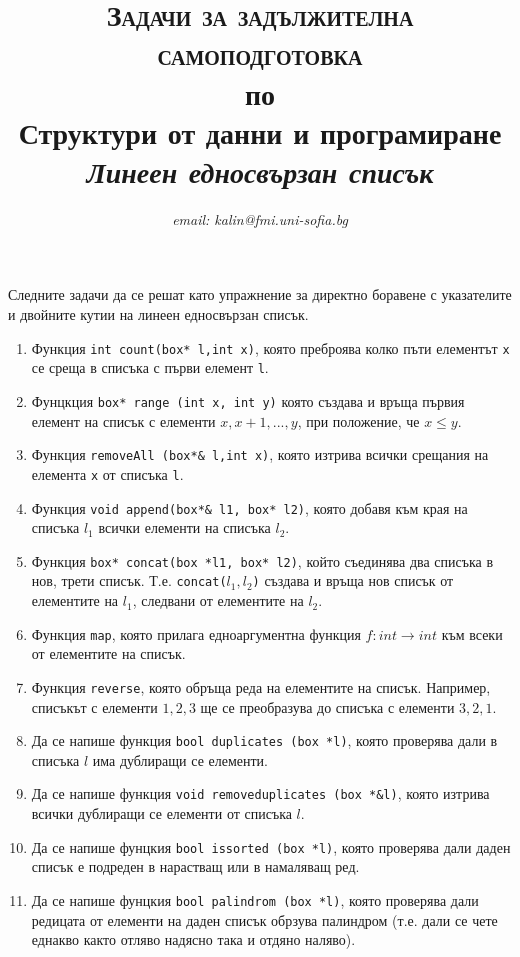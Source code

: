 \documentclass[12pt,a4paper]{article}
\author{\textit{email: kalin@fmi.uni-sofia.bg}}
\title{\textsc{Задачи за задължителна самоподготовка} \\
по \\
Структури от данни и програмиране\\
\textit{Линеен едносвързан списък}}
\newcommand{\code}[1]{\texttt{#1}}
\begin{document}
\maketitle

Следните задачи да се решат като упражнение за директно боравене с указателите и двойните кутии на линеен едносвързан списък.

\begin{enumerate}

	\item  Функция \code{int count(box* l,int x)}, която преброява колко пъти елементът \code{x} се среща в списъка с първи елемент \code{l}.
	\item  Фунцкция \code{box* range (int x, int y)} която създава и връща първия елемент на списък с елементи $x, x+1, ..., y$, при положение, че $x \leq y$.
	\item  Функция \code{removeAll (box*\& l,int x)}, която изтрива всички срещания на елемента \code{x} от списъка \code{l}.
	\item  Функция \code{void append(box*\& l1, box* l2)}, която добавя към края на списъка $l_1$ всички елементи на списъка $l_2$.
	\item  Функция \code{box* concat(box *l1, box* l2)}, който съединява два списъка в нов, трети списък. Т.е. \code{concat($l_1,l_2$)} създава и връща нов списък от елементите на \code{$l_1$}, следвани от елементите на \code{$l_2$}.
	\item  Функция \code{map}, която прилага едноаргументна функция $f:int \rightarrow int$ към всеки от елементите на списък.
	\item  Функция \code{reverse}, която обръща реда на елементите на списък. Например, списъкът с елементи $1,2,3$ ще се преобразува до списъка с елементи $3,2,1$.
	\item Да се напише функция \code{bool duplicates (box *l)}, която проверява дали в списъка $l$ има дублиращи се елементи.
	\item Да се напише функция \code{void removeduplicates (box *\&l)}, която изтрива всички дублиращи се елементи от списъка $l$.
	\item Да се напише фунцкия \code{bool issorted (box *l)}, която проверява дали даден списък е подреден в нарастващ или в намаляващ ред.
	\item Да се напише фунцкия \code{bool palindrom (box *l)}, която проверява дали редицата от елементи на даден списък обрзува палиндром (т.е. дали се чете еднакво както отляво надясно така и отдяно наляво).


\end{enumerate}


	\vspace{20px}
\end{document}
